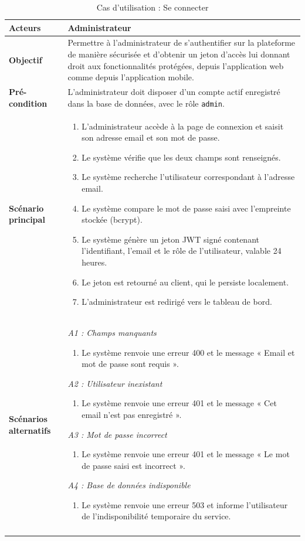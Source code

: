 \renewcommand{\arraystretch}{1.4}
\begin{longtable}{|p{3.0cm}|>{\raggedright\arraybackslash}p{11.4cm}|}
\hline
\textbf{Acteurs} & Administrateur \\
\hline
\textbf{Objectif} & Permettre à l'administrateur de s'authentifier sur la plateforme
de manière sécurisée et d'obtenir un jeton d'accès lui donnant droit aux fonctionnalités
protégées, depuis l'application web comme depuis l'application mobile. \\
\hline
\textbf{Pré-condition} & L'administrateur doit disposer d'un compte actif enregistré
dans la base de données, avec le rôle \texttt{admin}. \\
\hline
\textbf{Scénario principal} &
\begin{enumerate}[leftmargin=*, nosep]
  \item L'administrateur accède à la page de connexion et saisit son adresse email et
        son mot de passe.
  \item Le système vérifie que les deux champs sont renseignés.
  \item Le système recherche l'utilisateur correspondant à l'adresse email.
  \item Le système compare le mot de passe saisi avec l'empreinte stockée (bcrypt).
  \item Le système génère un jeton JWT signé contenant l'identifiant, l'email et le
        rôle de l'utilisateur, valable 24 heures.
  \item Le jeton est retourné au client, qui le persiste localement.
  \item L'administrateur est redirigé vers le tableau de bord.
\end{enumerate} \\
\hline
\textbf{Scénarios alternatifs} &
\textit{A1 : Champs manquants}
\begin{enumerate}[leftmargin=*, nosep]
  \item Le système renvoie une erreur 400 et le message « Email et mot de passe sont
        requis ».
\end{enumerate}
\textit{A2 : Utilisateur inexistant}
\begin{enumerate}[leftmargin=*, nosep]
  \item Le système renvoie une erreur 401 et le message « Cet email n'est pas
        enregistré ».
\end{enumerate}
\textit{A3 : Mot de passe incorrect}
\begin{enumerate}[leftmargin=*, nosep]
  \item Le système renvoie une erreur 401 et le message « Le mot de passe saisi est
        incorrect ».
\end{enumerate}
\textit{A4 : Base de données indisponible}
\begin{enumerate}[leftmargin=*, nosep]
  \item Le système renvoie une erreur 503 et informe l'utilisateur de l'indisponibilité
        temporaire du service.
\end{enumerate} \\
\hline
\caption{Cas d'utilisation : Se connecter}
\label{tab:cu-login}
\end{longtable}

